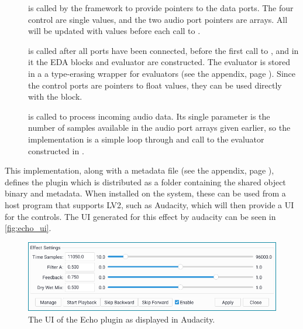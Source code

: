 \begin{description}
  \item [] is called by the framework to provide pointers to the data ports. The four control
        are single values, and the two audio port pointers are arrays. All will be updated with values before each
        call to .
  \item [] is called after all ports have been connected, before the first call to , and in it
        the EDA blocks and evaluator are constructed. The evaluator is stored in a  a
        type-erasing wrapper for evaluators (see the appendix, page \pageref{code:dyn_eval}). Since the control ports
        are pointers to float values, they can be used directly with the  block.
  \item [] is called to process incoming audio data. Its single parameter  is the number of
        samples available in the audio port arrays given earlier, so the implementation is a simple loop through and
        call to the evaluator constructed in .
\end{description}

This implementation, along with a metadata file (see the appendix, page \pageref{codefile:example/echo/manifest.ttl}), defines the
plugin which is distributed as a folder containing the shared object binary and metadata. When installed on
the system, these can be used from a host program that supports LV2, such as Audacity, which will then
provide a UI for the controls. The UI generated for this effect by audacity can be seen in
\autoref{fig:echo_ui}.

\begin{figure}
  \centering
  \includegraphics[width=\linewidth]{Pictures/echo_ui}
  \caption{The UI of the Echo plugin as displayed in Audacity.}
  \label{fig:echo_ui}
\end{figure}

